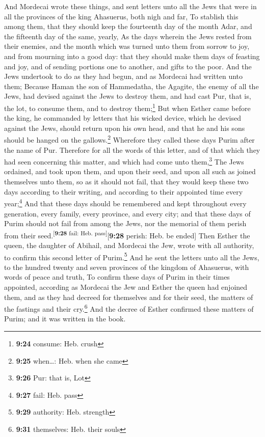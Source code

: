  And Mordecai wrote these things, and sent letters unto
all the Jews that were in all the provinces of the king Ahasuerus, both
nigh and far,  To stablish this among them, that they
should keep the fourteenth day of the month Adar, and the fifteenth day
of the same, yearly,  As the days wherein the Jews rested
from their enemies, and the month which was turned unto them from sorrow
to joy, and from mourning into a good day: that they should make them
days of feasting and joy, and of sending portions one to another, and
gifts to the poor.  And the Jews undertook to do as they
had begun, and as Mordecai had written unto them; 
Because Haman the son of Hammedatha, the Agagite, the enemy of all the
Jews, had devised against the Jews to destroy them, and had cast Pur,
that is, the lot, to consume them, and to destroy them;\footnote{\textbf{9:24}
  consume: Heb. crush}  But when Esther came before the
king, he commanded by letters that his wicked device, which he devised
against the Jews, should return upon his own head, and that he and his
sons should be hanged on the gallows.\footnote{\textbf{9:25} when\ldots:
  Heb. when she came}  Wherefore they called these days
Purim after the name of Pur. Therefore for all the words of this letter,
and of that which they had seen concerning this matter, and which had
come unto them,\footnote{\textbf{9:26} Pur: that is, Lot}
 The Jews ordained, and took upon them, and upon their
seed, and upon all such as joined themselves unto them, so as it should
not fail, that they would keep these two days according to their
writing, and according to their appointed time every year;\footnote{\textbf{9:27}
  fail: Heb. pass}  And that these days should be
remembered and kept throughout every generation, every family, every
province, and every city; and that these days of Purim should not fail
from among the Jews, nor the memorial of them perish from their
seed.\textsuperscript{{[}\textbf{9:28} fail: Heb.
pass{]}}{[}\textbf{9:28} perish: Heb. be ended{]}  Then
Esther the queen, the daughter of Abihail, and Mordecai the Jew, wrote
with all authority, to confirm this second letter of Purim.\footnote{\textbf{9:29}
  authority: Heb. strength}  And he sent the letters unto
all the Jews, to the hundred twenty and seven provinces of the kingdom
of Ahasuerus, with words of peace and truth,  To confirm
these days of Purim in their times appointed, according as Mordecai the
Jew and Esther the queen had enjoined them, and as they had decreed for
themselves and for their seed, the matters of the fastings and their
cry.\footnote{\textbf{9:31} themselves: Heb. their souls}
 And the decree of Esther confirmed these matters of
Purim; and it was written in the book.

